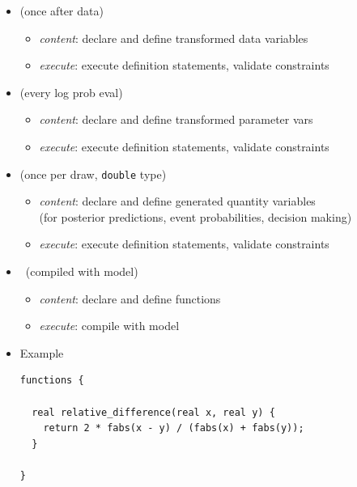 \documentclass[10pt]{report}
\newcommand{\sld}[1]{\newpage{\noindent\LARGE \ \ \
    \textcolor{MidnightBlue}{\bfseries #1}}\vspace*{4pt}}
\newcommand{\code}[1]{{\tt #1}}
\newcommand{\myemph}[1]{{\color{MidnightBlue}{\bfseries #1}}}
\begin{document}
\begin{itemize}
\item \myemph{\tt\bfseries transformed data} (once after data)
\vspace*{-4pt}
\begin{itemize}\small
\item {\slshape content}: declare and define transformed data variables
\item {\slshape execute}: execute definition statements, validate constraints
\end{itemize}
%
\item \myemph{\tt\bfseries transformed parameters} (every log prob eval)
\vspace*{-4pt}
\begin{itemize}\small
\item {\slshape content}: declare and define transformed parameter vars
\item {\slshape execute}: execute definition statements, validate constraints
\end{itemize}
%
\item \myemph{\tt\bfseries generated quantities} (once per draw, 
  \code{double} type)
\vspace*{-4pt}
\begin{itemize}\small
\item {\slshape content}: declare and define generated quantity
  variables
\\
{\footnotesize (for posterior predictions, event probabilities,
  decision making)}
\item {\slshape execute}: execute definition statements, validate constraints
\end{itemize}
%
\end{itemize}


\sld{User-Defined Functions (Stan 2.3)}

\begin{itemize}
\item \myemph{\tt\bfseries functions} \ (compiled with model)
\vspace*{-4pt}
\begin{itemize}\small
\item {\slshape content}: declare and define functions
\item {\slshape execute}: compile with model
\end{itemize}
\vspace*{12pt}
\item Example
\\[6pt]
\begin{minipage}[t]{0.8\textwidth}
\footnotesize
\begin{Verbatim}
functions {

  real relative_difference(real x, real y) {
    return 2 * fabs(x - y) / (fabs(x) + fabs(y));
  }

}
\end{Verbatim}
\end{minipage}
\end{itemize}
\end{document}
